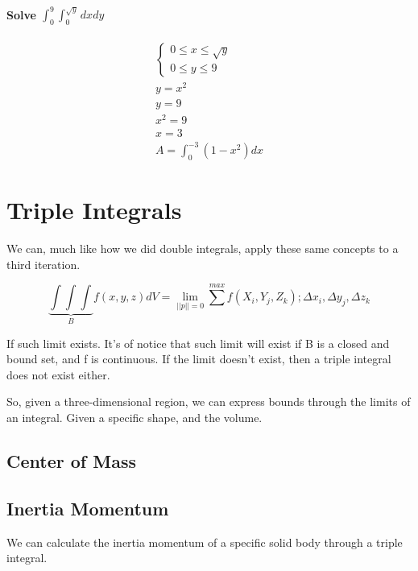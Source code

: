\documentclass[11pt,fleqn]{book} %
\begin{document}
\paragraph*{Solve $\int_{0}^9\int_0^{\sqrt{y}} dxdy$}
\begin{gather}
    \begin{cases}
        0 \leq x \leq \sqrt{y} \\
        0 \leq y \leq 9
    \end{cases} \\
    y = x^2 \\
    y = 9 \\
    x^2 = 9 \\
    x = 3 \\
    A = \int_0^{-3} (1-x^2) dx
\end{gather}

\section{Triple Integrals}

We can, much like how we did double integrals, apply these same concepts to a third iteration.

\begin{equation}
    \underbrace{\int\int\int}_{B} f(x,y,z) dV = \lim_{||p|| = 0} \sum_{}^{max} f(X_i,Y_j,Z_k); \Delta x_i, \Delta y_j, \Delta z_k
\end{equation}

If such limit exists. It's of notice that such limit will exist if B is a closed and bound set, and f is continuous.
If the limit doesn't exist, then a triple integral does not exist either.

So, given a three-dimensional region, we can express bounds through the limits of an integral.
Given a specific shape, and the volume.

\subsection{Center of Mass}



\subsection{Inertia Momentum}

We can calculate the inertia momentum of a specific solid body through a triple integral.
\end{document}
